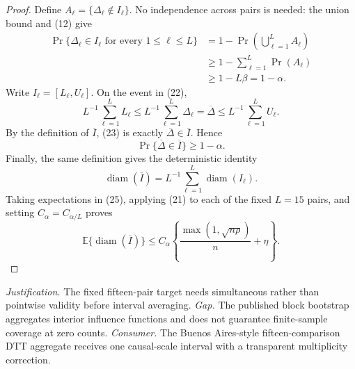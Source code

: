 \documentclass{article}
\begin{document}
\begin{proof}
Define \(A_\ell=\{\Delta_\ell\notin I_\ell\}\).  No independence across pairs is needed: the union bound and (12) give
\[
\begin{aligned}
\Pr\{\Delta_\ell\in I_\ell\text{ for every }1\leq\ell\leq L\}
&=1-\Pr\left(\bigcup_{\ell=1}^LA_\ell\right)\\
&\geq1-\sum_{\ell=1}^L\Pr(A_\ell)\\
&\geq1-L\beta
=1-\alpha.
\end{aligned}
\tag{22}
\]
Write \(I_\ell=[L_\ell,U_\ell]\).  On the event in (22),
\[
L^{-1}\sum_{\ell=1}^LL_\ell
\leq L^{-1}\sum_{\ell=1}^L\Delta_\ell
=\overline\Delta
\leq L^{-1}\sum_{\ell=1}^LU_\ell.
\tag{23}
\]
By the definition of \(\overline I\), (23) is exactly \(\overline\Delta\in\overline I\).  Hence
\[
\Pr\{\overline\Delta\in\overline I\}\geq1-\alpha.
\tag{24}
\]
Finally, the same definition gives the deterministic identity
\[
\operatorname{diam}(\overline I)
=L^{-1}\sum_{\ell=1}^L\operatorname{diam}(I_\ell).
\tag{25}
\]
Taking expectations in (25), applying (21) to each of the fixed \(L=15\) pairs, and setting \(C_\alpha=C_{\alpha/L}\) proves
\[
\mathbb E\{\operatorname{diam}(\overline I)\}
\leq C_\alpha\left\{
\frac{\max(1,\sqrt{n\rho})}{n}+\eta
\right\}.
\]
\end{proof}
\par\smallskip\noindent \textit{Justification.} The fixed fifteen-pair target needs simultaneous rather than pointwise validity before interval averaging. \textit{Gap.} The published block bootstrap aggregates interior influence functions and does not guarantee finite-sample coverage at zero counts. \textit{Consumer.} The Buenos Aires-style fifteen-comparison DTT aggregate receives one causal-scale interval with a transparent multiplicity correction.
\end{document}
